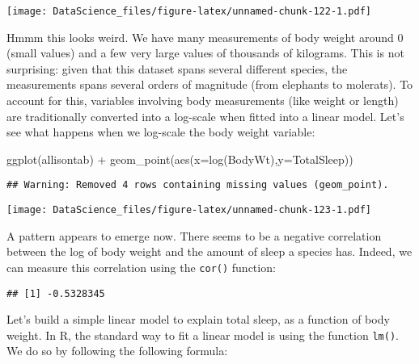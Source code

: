 \documentclass[
]{book}
\newenvironment{Shaded}{\begin{snugshade}}{\end{snugshade}}
\newcommand{\AttributeTok}[1]{\textcolor[rgb]{0.77,0.63,0.00}{#1}}
\newcommand{\FunctionTok}[1]{\textcolor[rgb]{0.00,0.00,0.00}{#1}}
\newcommand{\NormalTok}[1]{#1}
\newcommand{\SpecialCharTok}[1]{\textcolor[rgb]{0.00,0.00,0.00}{#1}}
\newcommand{\StringTok}[1]{\textcolor[rgb]{0.31,0.60,0.02}{#1}}
\begin{document}
\texttt{[image: DataScience\_files/figure-latex/unnamed-chunk-122-1.pdf]}

Hmmm this looks weird. We have many measurements of body weight around 0 (small values) and a few very large values of thousands of kilograms. This is not surprising: given that this dataset spans several different species, the measurements spans several orders of magnitude (from elephants to molerats). To account for this, variables involving body measurements (like weight or length) are traditionally converted into a log-scale when fitted into a linear model. Let's see what happens when we log-scale the body weight variable:

\begin{Shaded}
\begin{Highlighting}[]
\FunctionTok{ggplot}\NormalTok{(allisontab) }\SpecialCharTok{+} \FunctionTok{geom\_point}\NormalTok{(}\FunctionTok{aes}\NormalTok{(}\AttributeTok{x=}\FunctionTok{log}\NormalTok{(BodyWt),}\AttributeTok{y=}\NormalTok{TotalSleep))}
\end{Highlighting}
\end{Shaded}

\begin{verbatim}
## Warning: Removed 4 rows containing missing values (geom_point).
\end{verbatim}

\texttt{[image: DataScience\_files/figure-latex/unnamed-chunk-123-1.pdf]}

A pattern appears to emerge now. There seems to be a negative correlation between the log of body weight and the amount of sleep a species has. Indeed, we can measure this correlation using the \texttt{cor()} function:

\begin{Shaded}
\end{Shaded}

\begin{verbatim}
## [1] -0.5328345
\end{verbatim}

Let's build a simple linear model to explain total sleep, as a function of body weight. In R, the standard way to fit a linear model is using the function \texttt{lm()}. We do so by following the following formula:
\end{document}
